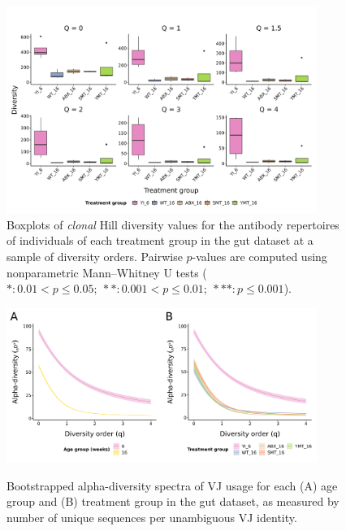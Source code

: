 \begin{figure}
\centering
\includegraphics[width = 0.9\textwidth]{_Figures/png/igseq-gut-clone-diversity-solo-groups}
\caption{Boxplots of \textit{clonal} Hill diversity values for the antibody repertoires of individuals of each treatment group in the \igseq gut dataset at a sample of diversity orders. Pairwise $p$-values are computed using nonparametric Mann–Whitney U tests ($*: 0.01 < p \leq 0.05;~**: 0.001 < p \leq 0.01;~***: p \leq 0.001$).}
\label{fig:igseq-gut-clone-diversity-solo-groups}
\end{figure}

\begin{figure}
\centering
\includegraphics[width = 0.9\textwidth]{_Figures/png/igseq-gut-VJ-diversity-alpha}
\begin{subfigure}{0em}
\label{fig:igseq-gut-VJ-diversity-alpha-age}
\end{subfigure}
\begin{subfigure}{0em}
\label{fig:igseq-gut-VJ-diversity-alpha-groups}
\end{subfigure}
\caption{Bootstrapped alpha-diversity spectra of VJ usage for each (A) age group and (B) treatment group in the \igseq gut dataset, as measured by number of unique sequences per unambiguous VJ identity.}
\label{fig:igseq-gut-VJ-diversity-alpha}
\end{figure}

